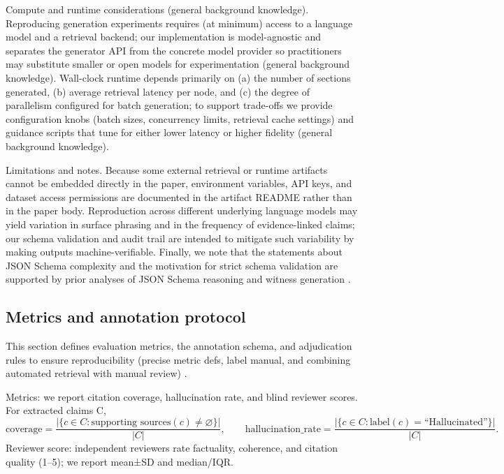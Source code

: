 \documentclass{article}%
\begin{document}
Compute and runtime considerations (general background knowledge).
Reproducing generation experiments requires (at minimum) access to a language model and a retrieval backend; our implementation is model-agnostic and separates the generator API from the concrete model provider so practitioners may substitute smaller or open models for experimentation (general background knowledge). Wall-clock runtime depends primarily on (a) the number of sections generated, (b) average retrieval latency per node, and (c) the degree of parallelism configured for batch generation; to support trade-offs we provide configuration knobs (batch sizes, concurrency limits, retrieval cache settings) and guidance scripts that tune for either lower latency or higher fidelity (general background knowledge).

Limitations and notes.
Because some external retrieval or runtime artifacts cannot be embedded directly in the paper, environment variables, API keys, and dataset access permissions are documented in the artifact README rather than in the paper body. Reproduction across different underlying language models may yield variation in surface phrasing and in the frequency of evidence-linked claims; our schema validation and audit trail are intended to mitigate such variability by making outputs machine-verifiable. Finally, we note that the statements about JSON Schema complexity and the motivation for strict schema validation are supported by prior analyses of JSON Schema reasoning and witness generation \cite{web_attouche_2022_witness_generation_for_json_schema,web_baazizi_2021_not_elimination_and_witness_generation_for_json_}.%

%
\subsection{Metrics and annotation protocol}%


%
This section defines evaluation metrics, the annotation schema, and adjudication rules to ensure reproducibility (precise metric defs, label manual, and combining automated retrieval with manual review) \cite{web_duru_an_2022_global_contentious_politics_database_glocon_anno,web_miok_2020_bayesian_methods_for_semi_supervised_text_annota,web_yao_2023_readme_bridging_medical_jargon_and_lay_understan}.

Metrics: we report citation coverage, hallucination rate, and blind reviewer scores. For extracted claims C,
\[
\mathrm{coverage}=\frac{\big|\{c\in C:\text{supporting sources}(c)\neq\varnothing\}\big|}{|C|},
\qquad
\mathrm{hallucination\_rate}=\frac{\big|\{c\in C:\text{label}(c)=\text{``Hallucinated''}\}\big|}{|C|}.
\]
Reviewer score: independent reviewers rate factuality, coherence, and citation quality (1–5); we report mean±SD and median/IQR.
\end{document}
